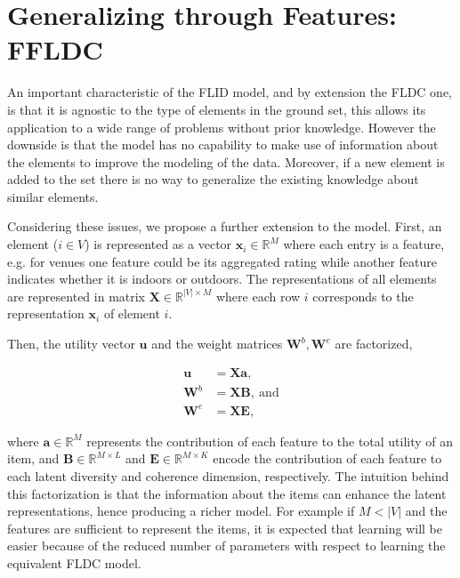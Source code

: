 \section{Generalizing through Features: FFLDC}

An important characteristic of the FLID model, and by extension the FLDC one, is that it is agnostic to the type of elements in the ground set, this allows its application to a wide range of problems without prior knowledge. However the downside is that the model has no capability to make use of information about the elements to improve the modeling of the data. Moreover, if a new element is added to the set there is no way to generalize the existing knowledge about similar elements.

Considering these issues, we propose a further extension to the model. First, an element ($i \in V$) is represented as a vector $\mathbf{x}_{i} \in \mathbb{R}^{M}$ where each entry is a feature, e.g. for venues one feature could be its aggregated rating while another feature indicates whether it is indoors or outdoors. The representations of all elements are represented in matrix $\mathbf{X} \in \mathbb{R}^{|V| \times M}$ where each row $i$ corresponds to the representation $\mathbf{x}_{i}$ of element $i$.

Then, the utility vector $\mathbf{u}$ and the weight matrices $\mathbf{W}^{b}, \mathbf{W}^{e}$ are factorized,

\begin{align}
  \mathbf{u} &= \mathbf{Xa},   \label{eq:ffldc-factorization-1} \\
  \mathbf{W}^{b} &= \mathbf{XB},\ \text{and}  \label{eq:ffldc-factorization-2} \\
  \mathbf{W}^{e} &= \mathbf{XE},
  \label{eq:ffldc-factorization-3}
\end{align} 

where $\mathbf{a} \in \mathbb{R}^{M}$ represents the contribution of each feature to the total utility of an item, and $\mathbf{B} \in \mathbb{R}^{M \times L}$ and $\mathbf{E} \in \mathbb{R}^{M \times K}$ encode the contribution of each feature to each latent diversity and coherence dimension, respectively. The intuition behind this factorization is that the information about the items can enhance the latent representations, hence producing a richer model. For example if $M < |V|$ and the features are sufficient to represent the items, it is expected that learning will be easier because of the reduced number of parameters with respect to learning the equivalent FLDC model.

